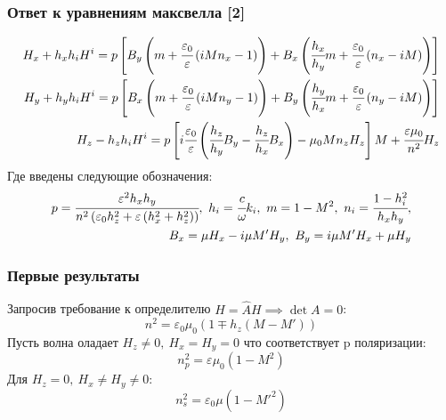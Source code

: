 \documentclass[handout]{beamer}
\newcommand{\inner}[1]{\left( #1 \right)}
\newcommand{\insqr}[1]{\left[ #1 \right]}
\newcommand{\eps}{\varepsilon}
\begin{document}
\begin{frame}
    \frametitle{Ответ к уравнениям максвелла [2]}
    \begin{eqnarray}
        H_x + h_x h_i H^i = p\insqr{B_y\inner{m + \cfrac{\eps_0}{\eps} \inner{iMn_x - 1}} 
        + B_x\inner{\cfrac{h_x}{h_y}m + \cfrac{\eps_0}{\eps} \inner{n_x - iM}}}\\
        H_y + h_y h_i H^i = p\insqr{B_x\inner{m + \cfrac{\eps_0}{\eps} \inner{iMn_y - 1}} 
        + B_y\inner{\cfrac{h_y}{h_x}m + \cfrac{\eps_0}{\eps} \inner{n_y - iM}}}\\
        H_z - h_z h_i H^i = p\insqr{i\cfrac{\eps_0}{\eps} \inner{\cfrac{h_z}{h_y}B_y - \cfrac{h_z}{h_x}B_x}-
        \mu_0 M n_z H_z}M + \cfrac{\eps \mu_0}{n^2}H_z
    \end{eqnarray}
    Где введены следующие обозначения:
    \begin{eqnarray*}
        p = \cfrac{\eps^2 h_x h_y}{n^2 \inner{\eps_0 h_z^2 + \eps \inner{h_x^2 + h_z^2}}}, \
        h_i = \cfrac{c}{\omega} k_i, \ m = 1 - M^2, \ n_i = \cfrac{1 - h_i^2}{h_x h_y}, \\  
        B_x = \mu H_x - i\mu M' H_y, \ B_y = i\mu M' H_x + \mu H_y   
    \end{eqnarray*}
\end{frame}

\begin{frame}
    \frametitle{Первые результаты}
    Запросив требование к определителю $H = \hat A H \implies \det{A} = 0$:
    \begin{equation}
        n^2 = \eps_0 \mu_0 \inner{1 \mp h_z \inner{M - M'}}
    \end{equation}
    Пусть волна оладает $H_z \neq 0, \ H_x = H_y = 0$ что соответствует p поляризации: 
    \begin{equation}
        n_p^2  = \eps \mu_0 \inner{1 - M^2}  
    \end{equation}
    Для $H_z = 0, \ H_x \neq H_y \neq 0$:
    \begin{equation}
        n_s^2  = \eps_0 \mu \inner{1 - M'^2}  
    \end{equation}
\end{frame}
\end{document}
